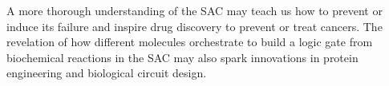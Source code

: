
%

A more thorough understanding of the SAC may teach us how to prevent or induce its failure and inspire drug discovery to prevent or treat cancers. The revelation of how different molecules orchestrate to build a  logic gate from biochemical reactions in the SAC may also spark innovations in protein engineering and biological circuit design.